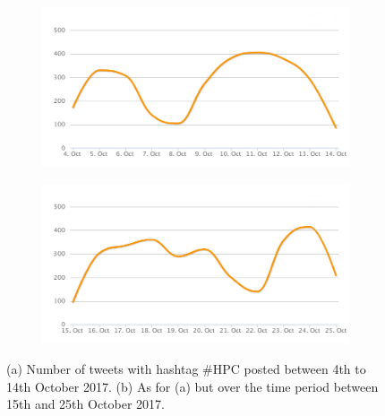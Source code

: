 \begin{figure}
 \centering
 \begin{subfigure}[b]{0.9\textwidth}
   \includegraphics[width=1\linewidth]{Images/FirstSearch_HPC.png}
   \caption{} 
 \end{subfigure}

 \begin{subfigure}[b]{0.9\textwidth}
   \includegraphics[width=1\linewidth]{Images/SecondSearch_HPC.png}
   \caption{}
 \end{subfigure}
 \caption{(a) Number of tweets with hashtag \#HPC posted between 4th to 14th October 2017. (b) As for (a) but over the time period between 15th and 25th October 2017.} 
 \label{First-SecondSearch_HPC}
\end{figure}

